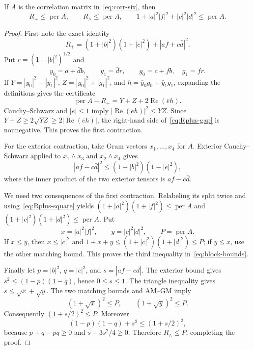 \documentclass[10pt,twoside]{siamart1116}
\newcommand{\per}{\operatorname{per}}
\newcommand{\Rea}{\operatorname{Re}}
\begin{document}
\begin{lemma}\label{lem:block-contractions}
If $A$ is the correlation matrix in~\eqref{eq:corr-six}, then
\begin{equation}\label{eq:block-bounds}
 R_+\leq\per A,\qquad R_\wedge\leq\per A,\qquad
 1+|a|^2|f|^2+|c|^2|d|^2\leq\per A.
\end{equation}
\end{lemma}

\begin{proof}
First note the exact identity
\begin{equation}\label{eq:Rplus-square}
 R_+=(1+|b|^2)(1+|e|^2)+|af+c\bar d|^2.
\end{equation}
Put $r=(1-|b|^2)^{1/2}$ and
\[
 y_0=a+\bar d b,\qquad y_1=\bar d r,\qquad
 g_0=c+fb,\quad g_1=fr.
\]
If $Y=|y_0|^2+|y_1|^2$, $Z=|g_0|^2+|g_1|^2$, and
$h=\bar y_0g_0+\bar y_1g_1$, expanding the definitions gives the certificate
\begin{equation}\label{eq:Rplus-gap}
 \per A-R_+=Y+Z+2\Rea(\bar e h).
\end{equation}
Cauchy--Schwarz and $|e|\leq1$ imply
$|\Rea(\bar e h)|^2\leq YZ$.  Since
$Y+Z\geq2\sqrt{YZ}\geq2|\Rea(\bar e h)|$, the right-hand side
of~\eqref{eq:Rplus-gap} is nonnegative.  This proves the first contraction.

For the exterior contraction, take Gram vectors $x_1,\ldots,x_4$ for $A$.
Exterior Cauchy--Schwarz applied to $x_1\wedge x_3$ and
$x_2\wedge x_4$ gives
\[
 |af-c\bar d|^2\leq(1-|b|^2)(1-|e|^2),
\]
where the inner product of the two exterior tensors is $af-c\bar d$.

We need two consequences of the first contraction.  Relabeling its split
twice and using~\eqref{eq:Rplus-square} yields
$(1+|a|^2)(1+|f|^2)\leq\per A$ and
$(1+|c|^2)(1+|d|^2)\leq\per A$.  Put
\[
 x=|a|^2|f|^2,\qquad y=|c|^2|d|^2,\qquad P=\per A.
\]
If $x\leq y$, then $x\leq|c|^2$ and
$1+x+y\leq(1+|c|^2)(1+|d|^2)\leq P$; if $y\leq x$, use the other matching
bound.  This proves the third inequality in~\eqref{eq:block-bounds}.

Finally let $p=|b|^2$, $q=|e|^2$, and
$s=|af-c\bar d|$.  The exterior bound gives
$s^2\leq(1-p)(1-q)$, hence $0\leq s\leq1$.  The triangle inequality gives
$s\leq\sqrt{x}+\sqrt{y}$.  The two matching bounds and AM--GM imply
\[
 (1+\sqrt{x})^2\leq P,\qquad (1+\sqrt{y})^2\leq P.
\]
Consequently $(1+s/2)^2\leq P$.  Moreover
\[
 (1-p)(1-q)+s^2\leq(1+s/2)^2,
\]
because $p+q-pq\geq0$ and $s-3s^2/4\geq0$.  Therefore
$R_\wedge\leq P$, completing the proof.
\end{proof}
\end{document}
